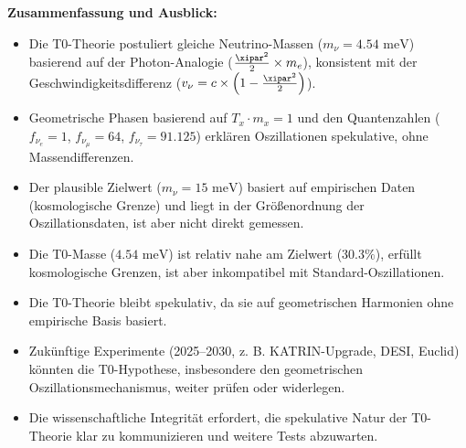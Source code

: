 	\begin{important}
		\textbf{Zusammenfassung und Ausblick:}
		\begin{itemize}
			\item Die T0-Theorie postuliert gleiche Neutrino-Massen (\(m_\nu = 4.54 \text{ meV}\)) basierend auf der Photon-Analogie (\(\frac{\xipar^2}{2} \times m_e\)), konsistent mit der Geschwindigkeitsdifferenz (\(v_\nu = c \times \left(1 - \frac{\xipar^2}{2}\right)\)).
			\item Geometrische Phasen basierend auf \(T_x \cdot m_x = 1\) und den Quantenzahlen (\(f_{\nu_e} = 1\), \(f_{\nu_\mu} = 64\), \(f_{\nu_\tau} = 91.125\)) erklären Oszillationen spekulative, ohne Massendifferenzen.
			\item Der plausible Zielwert (\(m_\nu = 15 \text{ meV}\)) basiert auf empirischen Daten (kosmologische Grenze) und liegt in der Größenordnung der Oszillationsdaten, ist aber nicht direkt gemessen.
			\item Die T0-Masse (\(4.54 \text{ meV}\)) ist relativ nahe am Zielwert (\(30.3\%\)), erfüllt kosmologische Grenzen, ist aber inkompatibel mit Standard-Oszillationen.
			\item Die T0-Theorie bleibt spekulativ, da sie auf geometrischen Harmonien ohne empirische Basis basiert.
			\item Zukünftige Experimente (2025–2030, z. B. KATRIN-Upgrade, DESI, Euclid) könnten die T0-Hypothese, insbesondere den geometrischen Oszillationsmechanismus, weiter prüfen oder widerlegen.
			\item Die wissenschaftliche Integrität erfordert, die spekulative Natur der T0-Theorie klar zu kommunizieren und weitere Tests abzuwarten.
		\end{itemize}
	\end{important}
	